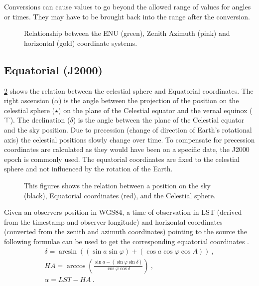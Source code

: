 Conversions can cause values to go beyond the allowed range of values
for angles or times. They may have to be brought back into the range
after the conversion.

\begin{figure}
    \centering
    
    \caption{Relationship between the ENU (green), Zenith Azimuth (pink)
             and horizontal (gold) coordinate systems.}
    \label{fig:enu_zenazi_horizontal}
\end{figure}


\subsection{Equatorial (J2000)}

\cref{fig:equatorial} shows the relation between the celestial sphere
and Equatorial coordinates. The right ascension ($\alpha$) is the angle
between the projection of the position on the celestial sphere ($\star$)
on the plane of the Celestial equator and the vernal equinox
($\vernal$). The declination ($\delta$) is the angle between the plane
of the Celestial equator and the sky position. Due to precession (change
of direction of Earth's rotational axis) the celestial positions slowly
change over time. To compensate for precession coordinates are
calculated as they would have been on a specific date, the J2000 epoch
is commonly used. The equatorial coordinates are fixed to the celestial
sphere and not influenced by the rotation of the Earth.

\begin{figure}
    \centering
    
    \caption{This figures shows the relation between a position on the
             sky (black), Equatorial coordinates (red), and the
             Celestial sphere.}
    \label{fig:equatorial}
\end{figure}

Given an observers position in WGS84, a time of observation in LST
(derived from the \gps timestamp and observer longitude) and horizontal
coordinates (converted from the zenith and azimuth coordinates) pointing
to the source the following formulae can be used to get the
corresponding equatorial coordinates \cite[p. 37]{duffet-smith:1990aa}.
%
\begin{equation}
    \label{eq:equatorial}
    \begin{array}{l}
        \delta = \arcsin{\left((\sin{a} \sin{\varphi}) +
                               (\cos{a} \cos{\varphi} \cos{A})\right)} \ , \\
        \mathit{HA} = \arccos{\left(\frac{\sin{a} - (\sin{\varphi} \sin{\delta})}
                                         {\cos{\varphi} \cos{\delta}}\right)} \ , \\
        \alpha = \mathit{LST} - \mathit{HA} \ .
    \end{array}
\end{equation}

